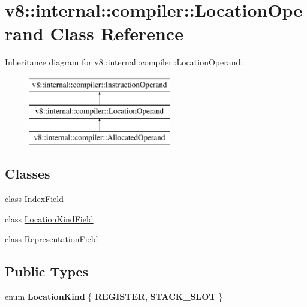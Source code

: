 \hypertarget{classv8_1_1internal_1_1compiler_1_1LocationOperand}{}\section{v8\+:\+:internal\+:\+:compiler\+:\+:Location\+Operand Class Reference}
\label{classv8_1_1internal_1_1compiler_1_1LocationOperand}
Inheritance diagram for v8\+:\+:internal\+:\+:compiler\+:\+:Location\+Operand\+:\begin{figure}[H]
\begin{center}
\leavevmode
\includegraphics[height=3.000000cm]{classv8_1_1internal_1_1compiler_1_1LocationOperand}
\end{center}
\end{figure}
\subsection*{Classes}
\begin{DoxyCompactItemize}
\item 
class \mbox{\hyperlink{classv8_1_1internal_1_1compiler_1_1LocationOperand_1_1IndexField}{Index\+Field}}
\item 
class \mbox{\hyperlink{classv8_1_1internal_1_1compiler_1_1LocationOperand_1_1LocationKindField}{Location\+Kind\+Field}}
\item 
class \mbox{\hyperlink{classv8_1_1internal_1_1compiler_1_1LocationOperand_1_1RepresentationField}{Representation\+Field}}
\end{DoxyCompactItemize}
\subsection*{Public Types}
\begin{DoxyCompactItemize}
\item 
\mbox{\label{classv8_1_1internal_1_1compiler_1_1LocationOperand_af9e0a334eaf58a05f9ea5b7139221140}} 
enum {\bfseries Location\+Kind} \{ {\bfseries R\+E\+G\+I\+S\+T\+ER}, 
{\bfseries S\+T\+A\+C\+K\+\_\+\+S\+L\+OT}
 \}
\end{DoxyCompactItemize}

